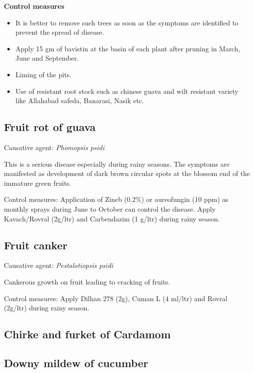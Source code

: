 \documentclass[
  openany]{book}
\providecommand{\tightlist}{%
  \setlength{\itemsep}{0pt}\setlength{\parskip}{0pt}}
\begin{document}
\textbf{Control measures}

\begin{itemize}
\tightlist
\item
  It is better to remove such trees as soon as the symptoms are identified to prevent the spread of disease.
\item
  Apply 15 gm of bavistin at the basin of each plant after pruning in March, June and September.
\item
  Liming of the pits.
\item
  Use of resistant root stock such as chinese guava and wilt resistant variety like Allahabad safeda, Banarasi, Nasik etc.
\end{itemize}

\hypertarget{fruit-rot-of-guava}{%
\subsection{Fruit rot of guava}\label{fruit-rot-of-guava}}

Causative agent: \emph{Phomopsis psidi}

This is a serious disease especially during rainy seasons. The symptoms are manifested as development of dark brown circular spots at the blossom end of the immature green fruits.

Control measures: Application of Zineb (0.2\%) or aureofungin (10 ppm) as monthly sprays during June to October can control the disease. Apply Kavach/Rovral (2g/ltr) and Carbendazim (1 g/ltr) during rainy season.

\hypertarget{fruit-canker}{%
\subsection{Fruit canker}\label{fruit-canker}}

Causative agent: \emph{Pestalotiopsis psidi}

Cankerous growth on fruit leading to cracking of fruits.

Control measures: Apply Dilhan 278 (2g), Cuman L (4 ml/ltr) and Rovral (2g/ltr) during rainy season.

\hypertarget{chirke-and-furket-of-cardamom}{%
\subsection{Chirke and furket of Cardamom}\label{chirke-and-furket-of-cardamom}}

\hypertarget{downy-mildew-of-cucumber}{%
\subsection{Downy mildew of cucumber}\label{downy-mildew-of-cucumber}}
\end{document}
